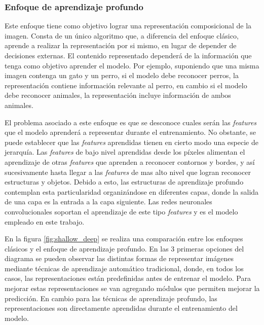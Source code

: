 \documentclass[a4paper,11pt,spanish]{book}
\begin{document}
      \subsubsection{Enfoque de aprendizaje profundo}
	Este enfoque tiene como objetivo lograr una representación composicional de la imagen. 
	Consta de un único algoritmo que, a diferencia del enfoque clásico, aprende a realizar la representación por si mismo, en lugar de depender de decisiones externas.
	El contenido representado dependerá de la información que tenga como objetivo aprender el modelo. 
	Por ejemplo, suponiendo que una misma imagen contenga un gato y un perro, si el modelo debe reconocer perros, la representación contiene información 
	relevante al perro, en cambio si el modelo debe reconocer animales, la representación incluye información de ambos animales.

	El problema asociado a este enfoque es que se desconoce cuales serán las \emph{features} que el modelo aprenderá a representar durante el entrenamiento.
	No obstante, se puede establecer que las \emph{features} aprendidas tienen en cierto modo una especie de jerarquía. 
	Las \emph{features} de bajo nivel aprendidas desde los píxeles alimentan el aprendizaje de otras \emph{features} que aprenden a reconocer contornos y bordes, 
	y así sucesivamente hasta llegar a las \emph{features} de mas alto nivel que logran reconocer estructuras y objetos. 
	Debido a esto, las estructuras de aprendizaje profundo contemplan esta particularidad organizándose en diferentes capas, donde la salida de una capa es la entrada 
	a la capa siguiente. Las redes neuronales convolucionales soportan el aprendizaje de este tipo \emph{features} y es el modelo empleado en este trabajo. 

	En la figura \ref{fig:shallow_deep} se realiza una comparación entre los enfoques clásicos y el enfoque de aprendizaje profundo.  
	En las 3 primeras opciones del diagrama se pueden observar las distintas formas de representar imágenes mediante técnicas de aprendizaje automático tradicional,
	donde, en todos los casos, las representaciones están predefinidas antes de entrenar el modelo. 
	Para mejorar estas representaciones se van agregando módulos que permiten mejorar la predicción.
	En cambio para las técnicas de aprendizaje profundo, las representaciones son directamente aprendidas durante el entrenamiento del modelo.
\end{document}
